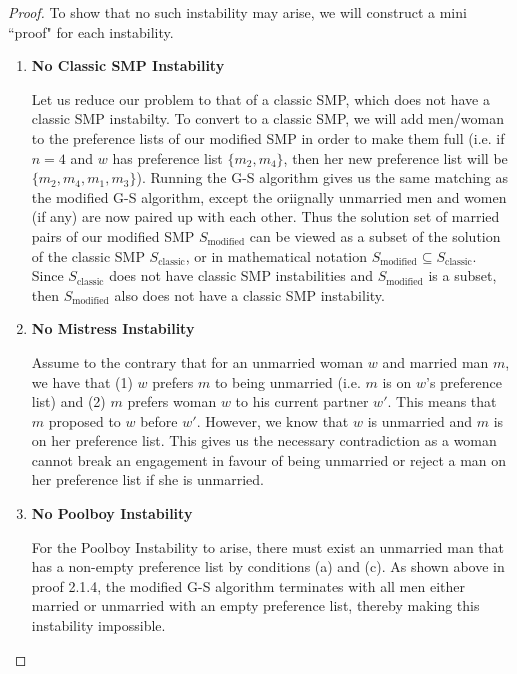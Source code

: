 \documentclass[11pt, oneside]{article}   	%
\theoremstyle{definition}
\theoremstyle{remark}
\begin{document}
\begin{proof}
To show that no such instability may arise, we will construct a mini ``proof" for each instability.

\begin{enumerate}
	\item \textbf{No Classic SMP Instability}
	
	Let us reduce our problem to that of a classic SMP, which does not have a classic SMP instabilty. To convert to a classic SMP, we will add men/woman to the preference lists of our modified SMP in order to make them full (i.e. if $n=4$ and $w$ has preference list $\{m_2, m_4\}$, then her new preference list will be $\{m_2, m_4, m_1, m_3\}$). Running the G-S algorithm gives us the same matching as the modified G-S algorithm, except the oriignally unmarried men and women (if any) are now paired up with each other. Thus the solution set of married pairs of our modified SMP $S_\text{modified}$ can be viewed as a subset of the solution of the classic SMP $S_\text{classic}$, or in mathematical notation $S_\text{modified} \subseteq S_\text{classic}$. Since $S_\text{classic}$ does not have classic SMP instabilities and $S_\text{modified}$ is a subset, then  $S_\text{modified}$ also does not have a classic SMP instability.

	\item \textbf{No Mistress Instability}
	
	Assume to the contrary that for an unmarried woman $w$ and married man $m$, we have that (1) $w$ prefers $m$ to being unmarried (i.e. $m$ is on $w$'s preference list) and (2) $m$ prefers woman $w$ to his current partner $w'$. This means that $m$ proposed to $w$ before $w'$. However, we know that $w$ is unmarried and $m$ is on her preference list. This gives us the necessary contradiction as a woman cannot break an engagement in favour of being unmarried or reject a man on her preference list if she is unmarried.

	\item \textbf{No Poolboy Instability}
	
	For the Poolboy Instability to arise, there must exist an unmarried man that has a non-empty preference list by conditions (a) and (c). As shown above in proof 2.1.4, the modified G-S algorithm terminates with all men either married or unmarried with an empty preference list, thereby making this instability impossible.
	
\end{enumerate}
\end{proof}
\end{document}
